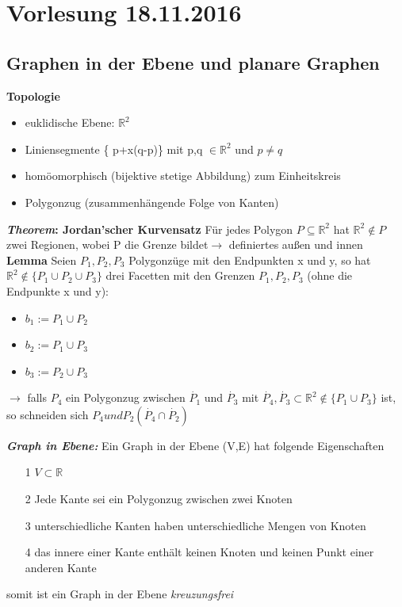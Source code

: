 \section{Vorlesung 18.11.2016}
\subsection{Graphen in der Ebene und planare Graphen}
\textbf{Topologie}
\begin{itemize}
	\item euklidische Ebene: $\mathbb{R}^2$ 
	\item Liniensegmente \{ p+x(q-p)\} mit p,q $\in \mathbb{R}^2$ und $p \neq q$
	\item homöomorphisch (bijektive stetige Abbildung) zum Einheitskreis
	\item Polygonzug (zusammenhängende Folge von Kanten)
\end{itemize}
\textbf{\textit{Theorem}: Jordan'scher Kurvensatz}\newline
Für jedes Polygon $P \subseteq \mathbb{R}^2$ hat $\mathbb{R}^2\notin P$ zwei Regionen, wobei P die Grenze bildet\newline $\rightarrow$ definiertes außen und innen \newline
\textbf{Lemma}\newline
Seien $P_1, P_2, P_3$ Polygonzüge mit den Endpunkten x und y, so hat $\mathbb{R}^2 \notin \{ P_1 \cup P_2 \cup P_3\}$ drei Facetten mit den Grenzen $P_1, P_2, P_3$ (ohne die Endpunkte x und y): 
\begin{itemize}
	\item{} $b_1 := P_1 \cup P_2$
	\item{} $b_2 := P_1 \cup P_3$
	\item{} $b_3 := P_2 \cup P_3$ 
\end{itemize}
$\rightarrow$ falls $P_4$ ein Polygonzug zwischen $\dot{P_1}$ und $\dot{P_3}$ mit $\dot{P_4}, \dot{P_3} \subset \mathbb{R}^2 \notin \{ P_1 \cup P_3\}$ ist, so schneiden sich $P_4 und P_2 (\dot{P_4} \cap \dot{P_2})$ \newline

\textbf{\textit{Graph in Ebene:}} \newline
Ein Graph in der Ebene (V,E) hat folgende Eigenschaften
\begin{itemize}
	\item[1] $V \subset \mathbb{R}$
	\item[2] Jede Kante sei ein Polygonzug zwischen zwei Knoten
	\item[3] unterschiedliche Kanten haben unterschiedliche Mengen von Knoten
	\item[4] das innere einer Kante enthält keinen Knoten und keinen Punkt einer anderen Kante 
\end{itemize}
somit ist ein Graph in der Ebene \textit{kreuzungsfrei} \newline

